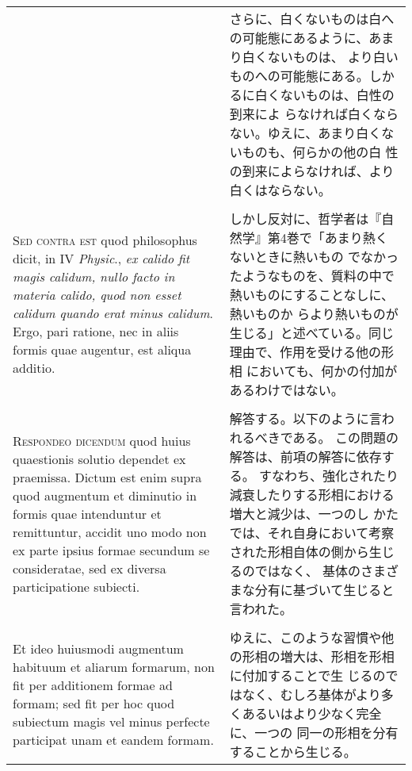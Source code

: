 \documentclass[10pt]{jsarticle} %
\begin{document}
\begin{longtable}{p{21em}p{21em}}
&

さらに、白くないものは白への可能態にあるように、あまり白くないものは、
 より白いものへの可能態にある。しかるに白くないものは、白性の到来によ
 らなければ白くならない。ゆえに、あまり白くないものも、何らかの他の白
 性の到来によらなければ、より白くはならない。

\\\\



{\scshape Sed contra est} quod philosophus dicit, in IV {\itshape
Physic}., {\itshape ex calido fit magis calidum, nullo facto in
materia calido, quod non esset calidum quando erat minus
calidum}. Ergo, pari ratione, nec in aliis formis quae augentur, est
aliqua additio.


&

しかし反対に、哲学者は『自然学』第4巻で「あまり熱くないときに熱いもの
でなかったようなものを、質料の中で熱いものにすることなしに、熱いものか
らより熱いものが生じる」と述べている。同じ理由で、作用を受ける他の形相
においても、何かの付加があるわけではない。

\\\\



{\scshape Respondeo dicendum} quod huius quaestionis solutio dependet ex
praemissa. Dictum est enim supra quod augmentum et diminutio in formis
quae intenduntur et remittuntur, accidit uno modo non ex parte ipsius
formae secundum se consideratae, sed ex diversa participatione
subiecti. 


&

解答する。以下のように言われるべきである。
この問題の解答は、前項の解答に依存する。
すなわち、強化されたり減衰したりする形相における増大と減少は、一つのし
 かたでは、それ自身において考察された形相自体の側から生じるのではなく、
 基体のさまざまな分有に基づいて生じると言われた。

\\\\

Et ideo huiusmodi augmentum habituum et aliarum formarum,
non fit per additionem formae ad formam; sed fit per hoc quod
subiectum magis vel minus perfecte participat unam et eandem
formam. 


&

ゆえに、このような習慣や他の形相の増大は、形相を形相に付加することで生
 じるのではなく、むしろ基体がより多くあるいはより少なく完全に、一つの
 同一の形相を分有することから生じる。


\end{longtable}
\end{document}
